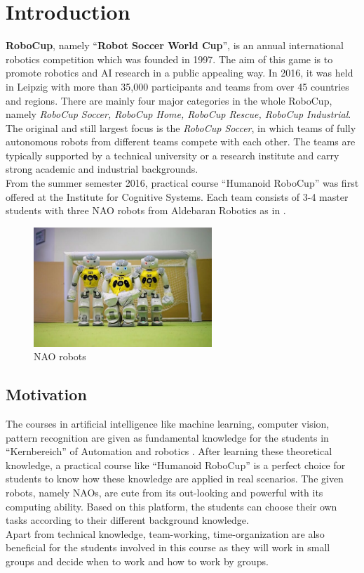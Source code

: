 \chapter{Introduction}
\textbf{RoboCup}, namely ``\textbf{Robot Soccer World Cup}'', is an annual international robotics competition which was founded in 1997. The aim of this game is to  promote robotics and AI research in a public appealing way. In 2016, it was held in Leipzig with more than 35,000 participants and teams from over 45 countries and regions. There are mainly four major categories in the whole RoboCup, namely \textit{RoboCup Soccer, RoboCup Home, RoboCup Rescue, RoboCup Industrial}. The original and still largest focus is the \textit{RoboCup Soccer}, in which teams of fully autonomous robots from different teams compete with each other. The teams are typically supported by a technical university or a research institute and carry strong academic and industrial backgrounds. \\
From the summer semester 2016, practical course ``Humanoid RoboCup'' was first offered at the Institute for Cognitive Systems. Each team consists of 3-4 master students with three NAO robots from Aldebaran Robotics as in .\\
\begin{figure}[!htb]
    \centering
    \includegraphics[width=0.6\textwidth]{pics/NAO}
    \caption{NAO robots}
    \label{NAOr}
\end{figure}
\clearpage
\section{Motivation}
The courses in artificial intelligence like machine learning, computer vision, pattern recognition are given as fundamental knowledge for the students in ``Kernbereich'' of Automation and robotics . After learning these theoretical knowledge, a practical course like ``Humanoid RoboCup'' is a perfect choice for students to know how these knowledge are applied in real scenarios. The given robots, namely NAOs, are cute from its out-looking and powerful with its computing ability.  Based on this platform, the students can choose their own tasks according to their different background knowledge.\\
Apart from technical knowledge, team-working, time-organization are also beneficial for the students involved in this course as they will work in small groups and decide when to work and how to work by groups.

